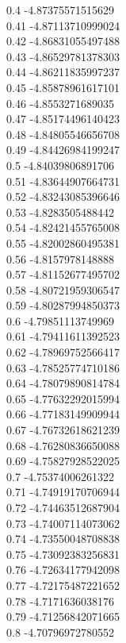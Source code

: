 {0.4	-4.87375571515629\\
0.41	-4.87113710999024\\
0.42	-4.86831055497488\\
0.43	-4.86529781378303\\
0.44	-4.86211835997237\\
0.45	-4.85878961617101\\
0.46	-4.8553271689035\\
0.47	-4.85174496140423\\
0.48	-4.84805546656708\\
0.49	-4.84426984199247\\
0.5	-4.84039806891706\\
0.51	-4.83644907664731\\
0.52	-4.83243085396646\\
0.53	-4.8283505488442\\
0.54	-4.82421455765008\\
0.55	-4.82002860495381\\
0.56	-4.8157978148888\\
0.57	-4.81152677495702\\
0.58	-4.80721959306547\\
0.59	-4.80287994850373\\
0.6	-4.79851113749969\\
0.61	-4.79411611392523\\
0.62	-4.78969752566417\\
0.63	-4.78525774710186\\
0.64	-4.78079890814784\\
0.65	-4.77632292015994\\
0.66	-4.77183149909944\\
0.67	-4.76732618621239\\
0.68	-4.76280836650088\\
0.69	-4.75827928522025\\
0.7	-4.75374006261322\\
0.71	-4.74919170706944\\
0.72	-4.74463512687904\\
0.73	-4.74007114073062\\
0.74	-4.73550048708838\\
0.75	-4.73092383256831\\
0.76	-4.72634177942098\\
0.77	-4.72175487221652\\
0.78	-4.7171636038176\\
0.79	-4.71256842071665\\
0.8	-4.70796972780552\\
}
